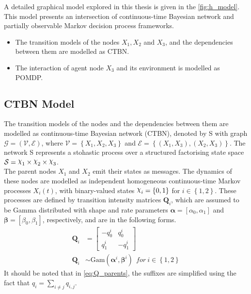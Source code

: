 A detailed graphical model explored in this thesis is given in the \cref{fig:h_model}. This model presents an intersection of continuous-time Bayesian network and partially observable Markov decision process frameworks. 
\begin{itemize}
	\item The transition models of the nodes $ X_1, X_2$ and $ X_3 $, and the dependencies between them are modelled as CTBN.
	\item The interaction of agent node $ X_3 $ and its environment is modelled as POMDP.
\end{itemize}

\subsection{CTBN Model}
\label{sec:exp_ctbn_model}
The transition models of the nodes and the dependencies between them are modelled as continuous-time Bayesian network (CTBN), denoted by S with graph $ \mathcal{G} = \left( \mathcal{V}, \mathcal{E}\right) $, where $ \mathcal{V} = \left\lbrace X_1, X_2, X_3 \right\rbrace $ and $ \mathcal{E} = \left\lbrace (X_1, X_3), (X_2, X_3)\right\rbrace  $. The network S represents a stohastic process over a structured factorising state space $ \mathcal{S} = \rchi_1 \times \rchi_2 \times \rchi_3 $.\\
The parent nodes $X_{1}$ and $ X_{2} $ emit their states as messages. The dynamics  of these nodes are modelled as independent homogeneous continuous-time Markov processes $X_{i}(t)$, with binary-valued states $ \rchi_{i} = \left\lbrace 0, 1 \right\rbrace  $ for $ i \in \left\lbrace 1,2 \right\rbrace $. These processes are defined by transition intensity matrices $ \textbf{Q}_{i} $, which are assumed to be Gamma distributed with shape and rate parameters $ \symbf{\alpha} = [\alpha_0, \alpha_1] $ and $ \symbf{\beta} = [\beta_0, \beta_1] $, respectively, and are in the following forms.
\begin{align}
\textbf{Q}_i &= 
\begin{bmatrix}
-q^i_{0} & q^i_{0} \\
q^i_{1} &  -q^i_{1}
\end{bmatrix}
\label{eq:Q_parents}\\
\textbf{Q}_{i} &\sim \mathrm{Gam}(\symbf{\alpha}^i, \symbf{\beta}^i)\ \ for\ i \in \left\lbrace 1,2\right\rbrace \label{eq:gamma_priors}
\end{align}
It should be noted that in \autoref{eq:Q_parents}, the suffixes are simplified using the fact that $ q_{i} = \sum_{i \neq j} q_{i,j}$.\\
